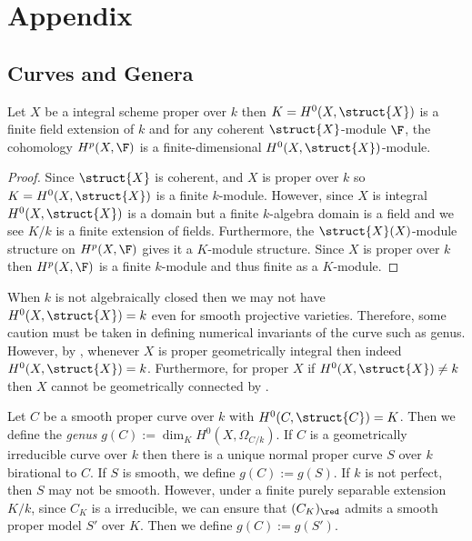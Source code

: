 

\section{Appendix}

\subsection{Curves and Genera}

\begin{lemma}
Let $X$ be a integral scheme proper over $k$ then $K = H^0(X, \struct{X})$ is a finite field extension of $k$ and for any coherent $\struct{X}$-module $\F$, the cohomology $H^p(X, \F)$ is a finite-dimensional $H^0(X, \struct{X})$-module.
\end{lemma}

\begin{proof}
Since $\struct{X}$ is coherent, and $X$ is proper over $k$ so $K = H^0(X, \struct{X})$ is a finite $k$-module. However, since $X$ is integral $H^0(X, \struct{X})$ is a domain but a finite $k$-algebra domain is a field and we see $K / k$ is a finite extension of fields. Furthermore, the $\struct{X}(X)$-module structure on $H^p(X, \F)$ gives it a $K$-module structure. Since $X$ is proper over $k$ then $H^p(X, \F)$ is a finite $k$-module and thus finite as a $K$-module.
\end{proof}

\begin{rmk}
When $k$ is not algebraically closed then we may not have $H^0(X, \struct{X}) = k$ even for smooth projective varieties. Therefore, some caution must be taken in defining numerical invariants of the curve such as genus. However, by \cite[\href{https://stacks.math.columbia.edu/tag/0BUG}{Tag 0BUG}]{stacks-project}, whenever $X$ is proper geometrically integral then indeed $H^0(X, \struct{X}) = k$. Furthermore, for proper $X$ if $H^0(X, \struct{X}) \neq k$ then $X$ cannot be geometrically connected by \cite[\href{https://stacks.math.columbia.edu/tag/0FD1}{Tag 0FD1}]{stacks-project}.
\end{rmk}

\begin{defn}
Let $C$ be a smooth proper curve over $k$ with $H^0(C, \struct{C}) = K$. Then we define the \textit{genus} $g(C) := \dim_K H^0(X, \Omega_{C / k})$. If $C$ is a geometrically irreducible curve over $k$ then there is a unique normal proper curve $S$ over $k$ birational to $C$. If $S$ is smooth, we define $g(C) := g(S)$. If $k$ is not perfect, then $S$ may not be smooth. However, under a finite purely separable extension $K / k$, since $C_K$ is a irreducible, we can ensure that $(C_K)_{\red}$ admits a smooth proper model $S'$ over $K$. Then we define $g(C) := g(S')$.
\end{defn}

